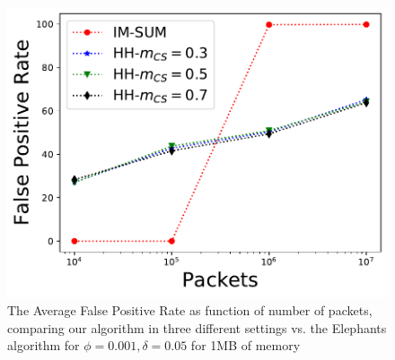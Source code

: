 \begin{figure} \centering
    \includegraphics[width=\linewidth]{HH/figures/FPR_per_pkts_m=1.0.pdf}
        \caption[Average False Positive for 1MB of memory]{The Average False Positive Rate as function of number of packets, comparing our algorithm in three different settings vs. the Elephants algorithm for $\phi=0.001,\delta=0.05$ for 1MB of memory}
    \label{fig:fig3_f}
\end{figure}